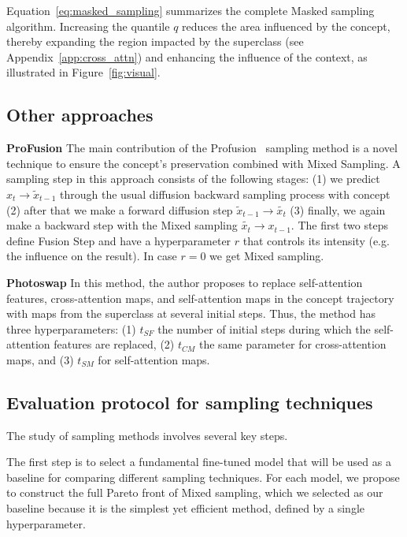 Equation~\ref{eq:masked_sampling} summarizes the complete Masked sampling algorithm. Increasing the quantile $q$ reduces the area influenced by the concept, thereby expanding the region impacted by the superclass (see Appendix~\ref{app:cross_attn}) and enhancing the influence of the context, as illustrated in Figure~\ref{fig:visual}.

\subsection{Other approaches}
\textbf{ProFusion} The main contribution of the Profusion~\citep{profusion} sampling method is a novel technique to ensure the concept's preservation combined with Mixed Sampling. A sampling step in this approach consists of the following stages: (1) we predict $x_t \rightarrow \tilde{x}_{t-1}$ through the usual diffusion backward sampling process with concept (2) after that we make a forward diffusion step $\tilde{x}_{t-1}\rightarrow \tilde{x_t}$ (3) finally, we again make a backward step with the Mixed sampling  $\tilde{x_{t}} \rightarrow x_{t-1}$. The first two steps define Fusion Step and have a hyperparameter $r$ that controls its intensity (e.g. the influence on the result). In case $r=0$ we get Mixed sampling.

\textbf{Photoswap} In this method, the author proposes to replace self-attention features, cross-attention maps, and self-attention maps in the concept trajectory with maps from the superclass at several initial steps. Thus, the method has three hyperparameters: (1) $t_{SF}$ the number of initial steps during which the self-attention features are replaced, (2) $t_{CM}$ the same parameter for cross-attention maps, and (3) $t_{SM}$ for self-attention maps.

\subsection{Evaluation protocol for sampling techniques}
The study of sampling methods involves several key steps. 


The first step is to select a fundamental fine-tuned model that will be used as a baseline for comparing different sampling techniques. For each model, we propose to construct the full Pareto front of Mixed sampling, which we selected as our baseline because it is the simplest yet efficient method, defined by a single hyperparameter.

